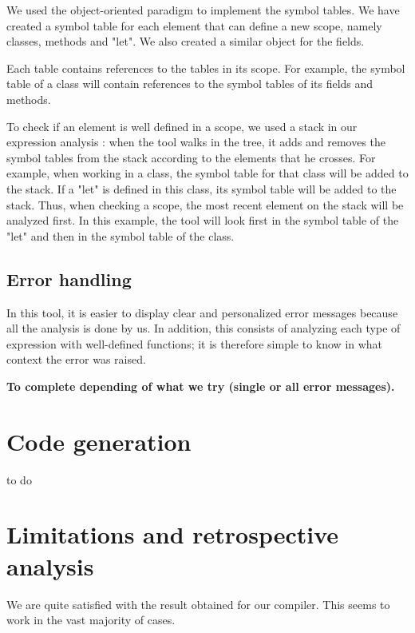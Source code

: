 \documentclass[a4paper, 12pt]{article}
\begin{document}
    We used the object-oriented paradigm to implement the symbol tables. We have created a symbol table for each element that can define a new scope, namely classes, methods and "let". We also created a similar object for the fields.
    
    Each table contains references to the tables in its scope. For example, the symbol table of a class will contain references to the symbol tables of its fields and methods.
    
    To check if an element is well defined in a scope, we used a stack in our expression analysis : when the tool walks in the tree, it adds and removes the symbol tables from the stack according to the elements that he crosses. For example, when working in a class, the symbol table for that class will be added to the stack. If a "let" is defined in this class, its symbol table will be added to the stack. Thus, when checking a scope, the most recent element on the stack will be analyzed first. In this example, the tool will look first in the symbol table of the "let" and then in the symbol table of the class.
    
    \subsection{Error handling}
    
    In this tool, it is easier to display clear and personalized error messages because all the analysis is done by us. In addition, this consists of analyzing each type of expression with well-defined functions; it is therefore simple to know in what context the error was raised.
    
    {\bf To complete depending of what we try (single or all error messages).}
    
    
    \section{Code generation}
    
    to do
    
    
    \section{Limitations and retrospective analysis}
    
    We are quite satisfied with the result obtained for our compiler. This seems to work in the vast majority of cases.
    
\end{document}
